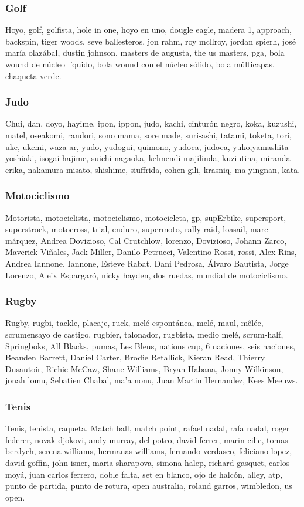 \documentclass[../all.tex]{subfiles}
\begin{document}
    \subsubsection{Golf}
    Hoyo, golf, golfista, hole in one, hoyo en uno, dougle eagle, madera 1, approach, backspin, tiger woods, seve ballesteros, jon rahm, roy mcllroy, jordan spierh, josé maría olazábal, dustin johnson, masters de augusta, the us masters, pga, bola wound de núcleo líquido, bola wound con el núcleo sólido, bola múlticapas, chaqueta verde.
    \subsubsection{Judo}
    Chui, dan, doyo, hayime, ipon, ippon, judo, kachi, cinturón negro, koka, kuzushi, matel, oseakomi, randori, sono mama, sore made, suri-ashi, tatami, toketa, tori, uke, ukemi, waza ar, yudo, yudogui, quimono, yudoca, judoca, yuko,yamashita yoshiaki, isogai hajime, suichi nagaoka, kelmendi majilinda, kuziutina, miranda erika, nakamura misato, shishime, siuffrida, cohen gili, krasniq, ma yingnan, kata.
    \subsubsection{Motociclismo}
    Motorista, motociclista, motociclismo, motocicleta, gp, supErbike, supersport, superstrock, motocross, trial, enduro, supermoto, rally raid, loasail, marc márquez, Andrea Dovizioso, Cal Crutchlow, lorenzo, Dovizioso, Johann Zarco, Maverick Viñales, Jack Miller, Danilo Petrucci, Valentino Rossi, rossi, Alex Rins, Andrea Iannone, Iannone, Esteve Rabat, Dani Pedrosa, Álvaro Bautista, Jorge Lorenzo, Aleix Espargaró, nicky hayden, dos ruedas, mundial de motociclismo.
    \subsubsection{Rugby}
    Rugby, rugbi, tackle, placaje, ruck, melé espontánea, melé, maul, mêlée, scrumensayo de castigo, rugbier, talonador, rugbista, medio melé, scrum-half, Springboks, All Blacks, pumas, Les Bleus, nations cup, 6 naciones, seis naciones, Beauden Barrett, Daniel Carter, Brodie Retallick, Kieran Read, Thierry Dusautoir, Richie McCaw, Shane Williams, Bryan Habana, Jonny Wilkinson, jonah lomu, Sebatien Chabal, ma'a nonu, Juan Martin Hernandez, Kees Meeuws.
    \subsubsection{Tenis}
    Tenis, tenista, raqueta, Match ball, match point, rafael nadal, rafa nadal, roger federer, novak djokovi, andy murray, del potro, david ferrer, marin cilic, tomas berdych, serena williams, hermanas williams, fernando verdasco, feliciano lopez, david goffin, john isner, maria sharapova, simona halep, richard gasquet, carlos moyá, juan carlos ferrero, doble falta, set en blanco, ojo de halcón, alley, atp, punto de partida, punto de rotura, open australia, roland garros, wimbledon, us open.
\end{document}
